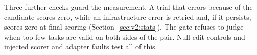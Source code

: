 Three further checks guard the measurement. A trial that errors because of the candidate scores zero, while an infrastructure error is retried and, if it persists, scores zero at final scoring (Section~\ref{sec:v2:stats}). The gate refuses to judge when too few tasks are valid on both sides of the pair. Null-edit controls and injected scorer and adapter faults test all of this. 
